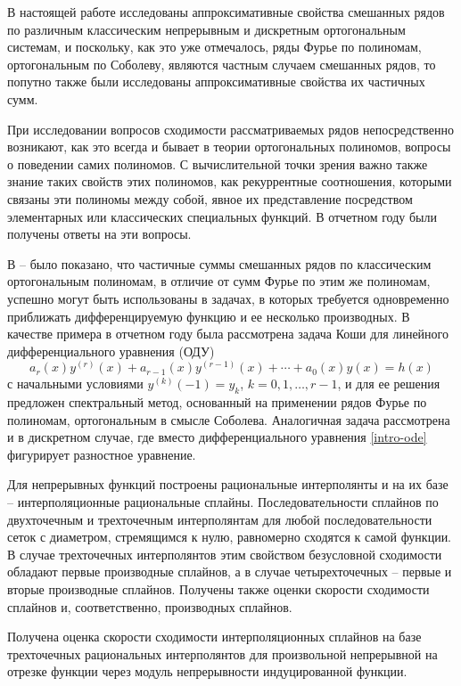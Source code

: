В настоящей работе  исследованы  аппроксимативные свойства смешанных рядов по различным классическим непрерывным и дискретным ортогональным системам, и поскольку, как это уже отмечалось, ряды Фурье по полиномам, ортогональным по Соболеву, являются частным случаем смешанных рядов, то попутно также были исследованы  аппроксимативные свойства их частичных сумм.

При исследовании вопросов сходимости рассматриваемых рядов непосредственно возникают, как это всегда и бывает в теории ортогональных полиномов, вопросы о поведении самих полиномов. С вычислительной точки зрения важно также знание таких свойств этих полиномов, как рекуррентные соотношения, которыми связаны эти полиномы между собой, явное их представление посредством элементарных или классических специальных функций. В отчетном году были получены ответы на эти вопросы.

В \cite{Haar-Tcheb-Shar11} -- \cite{Haar-Tcheb-Shar18} было показано, что частичные суммы смешанных рядов по классическим ортогональным полиномам, в отличие от сумм Фурье по этим же полиномам, успешно могут быть использованы в задачах, в которых требуется одновременно приближать дифференцируемую функцию и ее несколько производных. В качестве примера в отчетном году была рассмотрена задача Коши  для линейного дифференциального уравнения (ОДУ)
\begin{equation}\label{intro-ode}
 a_r(x)y^{(r)}(x)+a_{r-1}(x)y^{(r-1)}(x)+\cdots+a_0(x)y(x)=h(x)
 \end{equation}
с начальными условиями $y^{(k)}(-1)=y_k$, $k=0,1,\ldots,r-1$, и для ее решения предложен спектральный метод, основанный на применении рядов Фурье по полиномам, ортогональным в смысле Соболева. Аналогичная задача рассмотрена и в дискретном случае, где вместо дифференциального уравнения \eqref{intro-ode} фигурирует разностное уравнение.

Для непрерывных функций построены рациональные интерполянты и на их базе -- интерполяционные рациональные сплайны. Последовательности сплайнов по двухточечным и трехточечным интерполянтам для любой последовательности сеток с диаметром, стремящимся к нулю, равномерно сходятся к самой функции. В случае трехточечных интерполянтов этим свойством безусловной сходимости обладают первые производные сплайнов, а в случае четырехточечных – первые и вторые производные сплайнов. Получены также оценки скорости сходимости сплайнов и, соответственно, производных сплайнов.

Получена оценка скорости сходимости интерполяционных сплайнов на базе
трехточечных рациональных интерполянтов для произвольной непрерывной на
отрезке функции через модуль непрерывности индуцированной функции.

